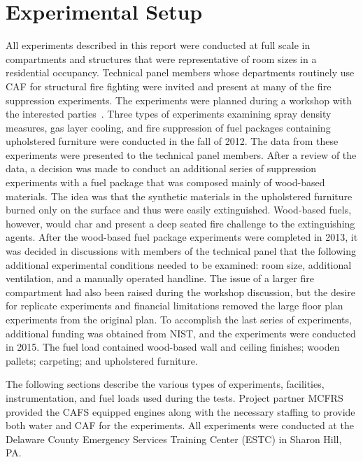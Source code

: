 \documentclass[12pt,oneside]{book}
\begin{document}
\chapter{Experimental Setup}

All experiments described in this report were conducted at full scale in compartments and structures that were representative of room sizes in a residential occupancy. Technical panel members whose departments routinely use CAF for structural fire fighting were invited and present at many of the fire suppression experiments. The experiments were planned during a workshop with the interested parties~\cite{Grant:2011}. Three types of experiments examining spray density measures, gas layer cooling, and fire suppression of fuel packages containing upholstered furniture were conducted in the fall of 2012. The data from these experiments were presented to the technical panel members. After a review of the data, a decision was made to conduct an additional series of suppression experiments with a fuel package that was composed mainly of wood-based materials. The idea was that the synthetic materials in the upholstered furniture burned only on the surface and thus were easily extinguished. Wood-based fuels, however, would char and present a deep seated fire challenge to the extinguishing agents.  After the wood-based fuel package experiments were completed in 2013, it was decided in discussions with members of the technical panel that the following additional experimental conditions needed to be examined: room size, additional ventilation, and a manually operated handline. The issue of a larger fire compartment had also been raised during the workshop discussion, but the desire for replicate experiments and financial limitations removed the large floor plan experiments from the original plan. To accomplish the last series of experiments, additional funding was obtained from NIST, and the experiments were conducted in 2015. The fuel load contained wood-based wall and ceiling finishes; wooden pallets; carpeting; and upholstered furniture.  

The following sections describe the various types of experiments, facilities, instrumentation, and fuel loads used during the tests. Project partner MCFRS provided the CAFS equipped engines along with the necessary staffing to provide both water and CAF for the experiments. All experiments were conducted at the Delaware County Emergency Services Training Center (ESTC) in Sharon Hill, PA.
\end{document}
